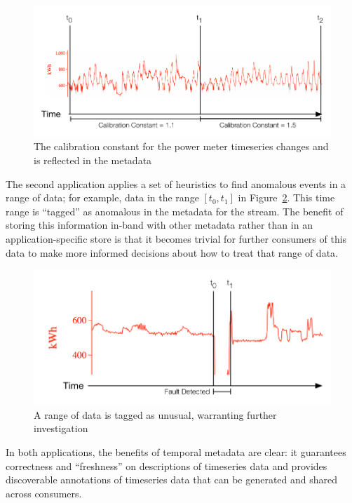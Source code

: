 \begin{figure}
\centering
\includegraphics[width=.9\linewidth]{figs/calibrationconstant.pdf}
\caption{The calibration constant for the power meter timeseries changes and is reflected
in the metadata}
\label{fig:calibrationconstant}
\end{figure}


The second application applies a set of heuristics to find anomalous events in a range of data; for example, data
in the range $[t_0, t_1]$ in Figure~\ref{fig:faultdetected}. This time range is ``tagged'' as anomalous in the metadata
for the stream. The benefit of storing this information in-band with other metadata rather than in an application-specific
store is that it becomes trivial for further consumers of this data to make more informed decisions about how to treat
that range of data.

\begin{figure}
\centering
\includegraphics[width=.9\linewidth]{figs/faultdetected.pdf}
\caption{A range of data is tagged as unusual, warranting further investigation}
\label{fig:faultdetected}
\end{figure}

In both applications, the benefits of temporal metadata are clear: it guarantees
correctness and ``freshness'' on descriptions of timeseries data and provides
discoverable annotations of timeseries data that can be generated and shared across
consumers.

